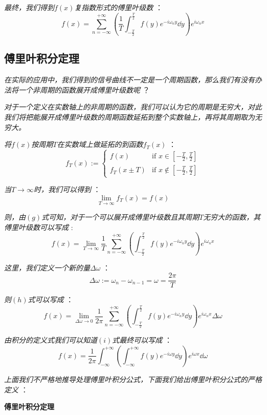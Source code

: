 \textit{最终，我们得到$f(x)$复指数形式的傅里叶级数 }：
\[f(x)=\sum_{n=-\infty}^{+\infty}(\frac{1}{T}\int_{-\frac{T}{2}}^{\frac{T}{2}}f(y)e^{-i\omega_n y}\dd{y})e^{i\omega_n x} \tag{g}\]

\subsection{傅里叶积分定理}

\textit{在实际的应用中，我们得到的信号曲线不一定是一个周期函数，那么我们有没有办法将一个非周期的函数展开成傅里叶级数呢} ？

\textit{对于一个定义在实数轴上的非周期的函数，我们可以认为它的周期是无穷大，对此我们将把能展开成傅里叶级数的周期函数延拓到整个实数轴上，再将其周期取为无穷大。}

\textit{将$f(x)$按周期$T$在实数域上做延拓的到函数$f_T(x)$ }：
\[ f_T(x) := \left\{
\begin{array}{rl}
f(x) & \text{if } x \in [-\frac{T}{2},\frac{T}{2}]\\
f_T(x \pm T) & \text{if } x \notin [-\frac{T}{2},\frac{T}{2}] 
\end{array} \right. \]

\textit{当$T \rightarrow \infty$时，我们可以得到 }：
\[\lim_{T \rightarrow \infty}{f_T(x)=f(x)}\]

\textit{则，由$(g)$式可知，对于一个可以展开成傅里叶级数且其周期$T$无穷大的函数，其傅里叶级数可以写成 }:
\[f(x)=\lim_{T \rightarrow \infty}\frac{1}{T}\sum_{n=-\infty}^{+\infty}(\int_{-\frac{T}{2}}^{\frac{T}{2}}f(y)e^{-i\omega_n y}\dd{y})e^{i\omega_n x} \tag{h}\]

\textit{这里，我们定义一个新的量$\Delta{\omega}$ }：
\[\Delta{\omega}:=\omega_n-\omega_{n-1}=\omega=\frac{2\pi}{T}\]

\textit{则$(h)$式可以写成 }：
\[f(x)=\lim_{\Delta{\omega} \rightarrow 0}\frac{1}{2\pi}\sum_{n=-\infty}^{+\infty}(\int_{-\frac{T}{2}}^{\frac{T}{2}}f(y)e^{-i\omega_n y}\dd{y})e^{i\omega_n x}\Delta{\omega} \tag{i}\]

\textit{由积分的定义式我们可以知道$(i)$式最终可以写成 }：
\[f(x)=\frac{1}{2\pi}\int_{-\infty}^{+\infty}(\int_{-\infty}^{+\infty}f(y)e^{-i\omega y}\dd{y})e^{i\omega x}\dd{\omega} \tag{j}\]

\textit{上面我们不严格地推导处理傅里叶积分公式，下面我们给出傅里叶积分公式的严格定义 }：

\textbf{傅里叶积分定理}


\qquad \qquad {}

